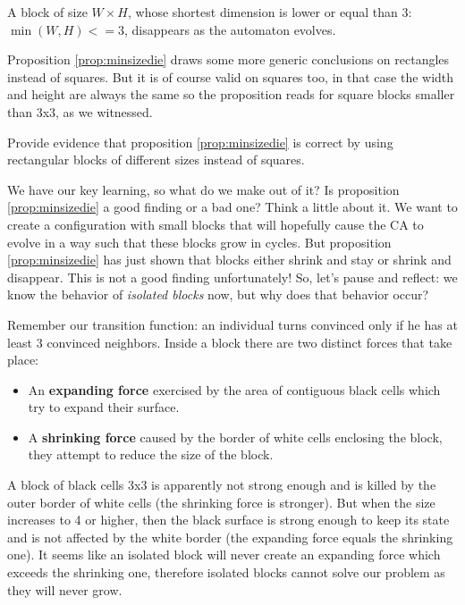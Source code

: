 \begin{proposition}
\label{prop:minsizedie}
A block of size $W \times H$, whose shortest dimension is lower or equal than 3: $\min(W,H) <= 3$,
disappears as the automaton evolves.
\end{proposition}

Proposition \ref{prop:minsizedie} draws some more generic conclusions on rectangles instead of squares.
But it is of course valid on squares too, in that case the width and height are always the same so
the proposition reads for square blocks smaller than 3x3, as we witnessed.

\begin{problem}
\label{prob:blocksizedie}
Provide evidence that proposition \ref{prop:minsizedie} is correct by using rectangular blocks
of different sizes instead of squares.
\end{problem}

We have our key learning, so what do we make out of it? Is proposition \ref{prop:minsizedie} a good
finding or a bad one? Think a little about it. We want to create a configuration with small blocks
that will hopefully cause the CA to evolve in a way such that these blocks grow in cycles. But
proposition \ref{prop:minsizedie} has just shown that blocks either shrink and stay or shrink and
disappear. This is not a good finding unfortunately!
So, let's pause and reflect: we know the behavior of
\textit{isolated blocks} now, but why does that behavior occur?

Remember our transition function:
an individual turns convinced only if he has at least 3 convinced neighbors.
Inside a block there are two distinct forces that take place:

\begin{itemize}
\item An \textbf{expanding force} exercised by the area of contiguous black cells which
try to expand their surface.
\item A \textbf{shrinking force} caused by the border of white cells enclosing the block, they
attempt to reduce the size of the block.
\end{itemize}

A block of
black cells 3x3 is apparently not strong enough and is killed by the outer border of white cells
(the shrinking force is stronger).
But when the size increases to 4 or higher, then the black surface is strong enough to keep its state
and is not affected by the white border (the expanding force equals the shrinking one).
It seems like an isolated block will never create an expanding force which exceeds the shrinking one,
therefore isolated blocks cannot solve our problem as they will never grow.

